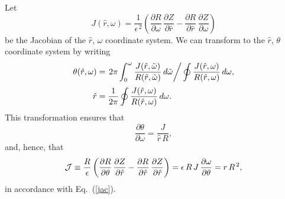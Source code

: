 \documentclass[12pt,prb,aps]{revtex4-1}
\begin{document}
Let
\begin{equation}
J(\hat{r},\omega) = \frac{1}{\epsilon^{\,2}}\left(\frac{\partial R}{\partial\omega}\,\frac{\partial Z}{\partial \hat{r}} -\frac{\partial R}{\partial \hat{r}}\,\frac{\partial Z}{\partial \omega}\right)
\end{equation}
be the Jacobian of the $\hat{r}$, $\omega$ coordinate system. We can transform to the $\hat{r}$, $\theta$ coordinate system 
by writing
\begin{align}\label{e11}
\theta(\hat{r},\omega) &= \left.2\pi\int_0^\omega \frac{J(\hat{r},\tilde{\omega})}{R(\hat{r},\tilde{\omega})}\,d\tilde{\omega}\right/\oint\frac{J(\hat{r},\omega)}{R(\hat{r},\omega)}\,d\omega,\\[0.5ex]
\hat{r}&=\frac{1}{2\pi}\oint\frac{J(\hat{r},\omega)}{R(\hat{r},\omega)}\,d\omega.\label{e12}
\end{align}
This transformation ensures that 
\begin{equation}
\frac{\partial\theta}{\partial\omega} = \frac{J}{\hat{r}\,R},
\end{equation}
and, hence, that 
\begin{equation}
{\cal J} \equiv \frac{R}{\epsilon} \left(\frac{\partial R}{\partial\theta}\,\frac{\partial Z}{\partial \hat{r}} -\frac{\partial R}{\partial \hat{r}}\,\frac{\partial Z}{\partial \hat{r}}\right)
=\epsilon\, R\,J\,\frac{\partial\omega}{\partial\theta} =r\,R^{\,2},
\end{equation}
in accordance with Eq.~(\ref{jac}). 
\end{document}
